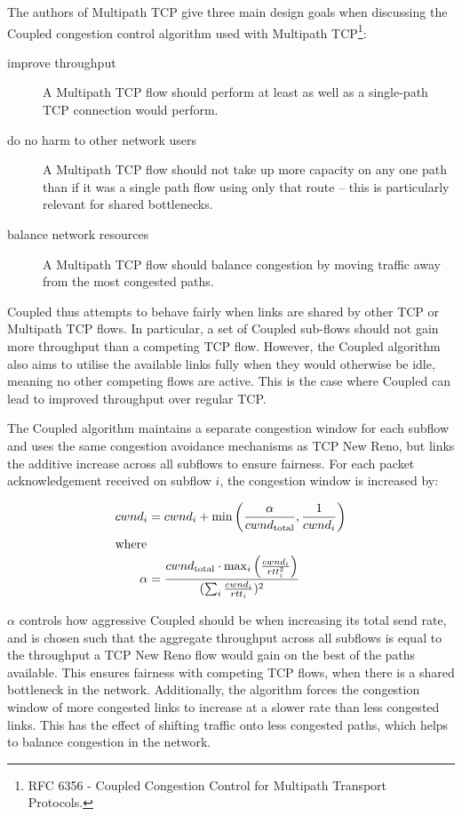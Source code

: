 
The authors of Multipath TCP give three main design goals when discussing the
Coupled congestion control algorithm used with Multipath TCP\footnote{RFC 6356 - Coupled Congestion Control for
Multipath Transport Protocols.}:

\begin{description}
  \item[improve throughput] A Multipath TCP flow should perform at least as well
    as a single-path TCP connection would perform.
  \item[do no harm to other network users] A Multipath TCP flow should not take
    up more capacity on any one path than if it was a single path flow using
    only that route -- this is particularly relevant for shared bottlenecks.
  \item[balance network resources] A Multipath TCP flow should balance congestion by moving
    traffic away from the most congested paths.
\end{description}

Coupled thus attempts to behave fairly when links are shared by other TCP or
Multipath TCP flows. In particular, a set of Coupled sub-flows should not gain
more throughput than a competing TCP flow. However, the Coupled algorithm also
aims to utilise the available
links fully when they would otherwise be idle, meaning no other competing flows
are active. This is the case where Coupled can lead to improved throughput over
regular TCP.

The Coupled algorithm maintains a separate congestion window for each subflow
and uses the same congestion avoidance mechanisms as TCP New Reno, but links the
additive increase across all subflows to ensure fairness. For each packet
acknowledgement received on subflow $i$, the congestion window is increased by:

\begin{align*}
  cwnd_i &= cwnd_i +
    \min\left(\frac{\alpha}{cwnd_\text{total}}, \frac{1}{cwnd_i}\right) \\
  \intertext{where}
  \alpha &=
    \frac{cwnd_\text{total} \cdot \max_i\left(\frac{cwnd_i}{rtt_i^2}\right)}
         {(\sum_i \frac{cwnd_i}{rtt_i})^2}
\end{align*}

$\alpha$ controls how aggressive Coupled should be when
increasing its total send rate, and is chosen such that the aggregate throughput
across all subflows is equal to the throughput a TCP New Reno flow would gain on
the best of the paths available. This ensures fairness with competing TCP flows,
when there is a shared bottleneck in the network.
Additionally, the algorithm forces the congestion window of more congested links
to increase at a slower rate than less congested links. This has the effect of
shifting traffic onto less congested paths, which helps to balance congestion in
the network.

